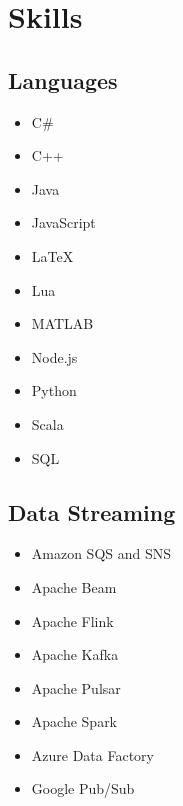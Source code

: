\documentclass[letterpaper]{resume}
\begin{document}



\begin{minipage}[t]{0.27\columnwidth}


\section{Skills}

\subsection{Languages}
\vspace{2pt}
\begin{itemize}
\item C\#
\item C++
\item Java
\item JavaScript
\item \LaTeX
\item Lua
\item MATLAB
\item Node.js
\item Python
\item Scala
\item SQL
\end{itemize}

\sectionspace

\subsection{Data Streaming}
\vspace{2pt}
\begin{itemize}
\item Amazon SQS and SNS
\item Apache Beam
\item Apache Flink
\item Apache Kafka
\item Apache Pulsar
\item Apache Spark
\item Azure Data Factory
\item Google Pub/Sub
\end{itemize}


\end{minipage}
\end{document}
